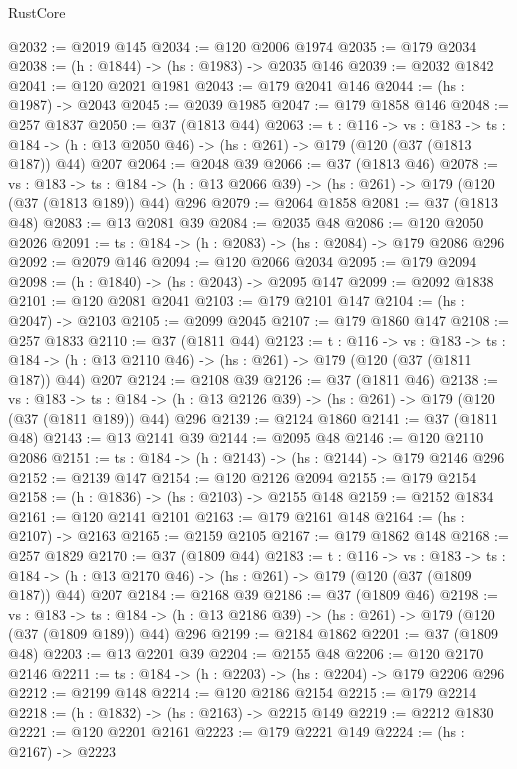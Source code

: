 \begin{lexlean}{RustCore}
\begin{coremodule}
@2032 := @2019 @145
@2034 := @120 @2006 @1974
@2035 := @179 @2034
@2038 := (h : @1844) -> (hs : @1983) -> @2035 @146
@2039 := @2032 @1842
@2041 := @120 @2021 @1981
@2043 := @179 @2041 @146
@2044 := (hs : @1987) -> @2043
@2045 := @2039 @1985
@2047 := @179 @1858 @146
@2048 := @257 @1837
@2050 := @37 (@1813 @44)
@2063 := {t : @116} ->
  {vs : @183} ->
  {ts : @184} -> (h : @13 @2050 @46) -> (hs : @261) -> @179 (@120 (@37 (@1813 @187)) @44) @207
@2064 := @2048 @39
@2066 := @37 (@1813 @46)
@2078 := {vs : @183} ->
  {ts : @184} -> (h : @13 @2066 @39) -> (hs : @261) -> @179 (@120 (@37 (@1813 @189)) @44) @296
@2079 := @2064 @1858
@2081 := @37 (@1813 @48)
@2083 := @13 @2081 @39
@2084 := @2035 @48
@2086 := @120 @2050 @2026
@2091 := {ts : @184} -> (h : @2083) -> (hs : @2084) -> @179 @2086 @296
@2092 := @2079 @146
@2094 := @120 @2066 @2034
@2095 := @179 @2094
@2098 := (h : @1840) -> (hs : @2043) -> @2095 @147
@2099 := @2092 @1838
@2101 := @120 @2081 @2041
@2103 := @179 @2101 @147
@2104 := (hs : @2047) -> @2103
@2105 := @2099 @2045
@2107 := @179 @1860 @147
@2108 := @257 @1833
@2110 := @37 (@1811 @44)
@2123 := {t : @116} ->
  {vs : @183} ->
  {ts : @184} -> (h : @13 @2110 @46) -> (hs : @261) -> @179 (@120 (@37 (@1811 @187)) @44) @207
@2124 := @2108 @39
@2126 := @37 (@1811 @46)
@2138 := {vs : @183} ->
  {ts : @184} -> (h : @13 @2126 @39) -> (hs : @261) -> @179 (@120 (@37 (@1811 @189)) @44) @296
@2139 := @2124 @1860
@2141 := @37 (@1811 @48)
@2143 := @13 @2141 @39
@2144 := @2095 @48
@2146 := @120 @2110 @2086
@2151 := {ts : @184} -> (h : @2143) -> (hs : @2144) -> @179 @2146 @296
@2152 := @2139 @147
@2154 := @120 @2126 @2094
@2155 := @179 @2154
@2158 := (h : @1836) -> (hs : @2103) -> @2155 @148
@2159 := @2152 @1834
@2161 := @120 @2141 @2101
@2163 := @179 @2161 @148
@2164 := (hs : @2107) -> @2163
@2165 := @2159 @2105
@2167 := @179 @1862 @148
@2168 := @257 @1829
@2170 := @37 (@1809 @44)
@2183 := {t : @116} ->
  {vs : @183} ->
  {ts : @184} -> (h : @13 @2170 @46) -> (hs : @261) -> @179 (@120 (@37 (@1809 @187)) @44) @207
@2184 := @2168 @39
@2186 := @37 (@1809 @46)
@2198 := {vs : @183} ->
  {ts : @184} -> (h : @13 @2186 @39) -> (hs : @261) -> @179 (@120 (@37 (@1809 @189)) @44) @296
@2199 := @2184 @1862
@2201 := @37 (@1809 @48)
@2203 := @13 @2201 @39
@2204 := @2155 @48
@2206 := @120 @2170 @2146
@2211 := {ts : @184} -> (h : @2203) -> (hs : @2204) -> @179 @2206 @296
@2212 := @2199 @148
@2214 := @120 @2186 @2154
@2215 := @179 @2214
@2218 := (h : @1832) -> (hs : @2163) -> @2215 @149
@2219 := @2212 @1830
@2221 := @120 @2201 @2161
@2223 := @179 @2221 @149
@2224 := (hs : @2167) -> @2223

\end{coremodule}
\end{lexlean}
